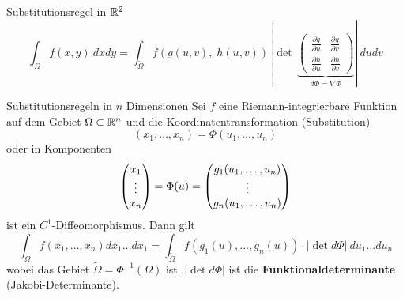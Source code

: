 \begin{Satz}{Substitutionsregel in $\mathbb{R}^2$}{}
    \[
        \int_{\Omega} f(x,y) ~ dx dy = \int_{\widetilde{\Omega}} f(g(u, v), \; h(u, v)) \, 
		    \left\lvert\det \, \underbrace{\begin{pmatrix}
			    \frac{\partial g}{\partial u} & \frac{\partial g}{\partial v}\\
			    \frac{\partial h}{\partial u} & \frac{\partial h}{\partial v}
		    \end{pmatrix}}_{d\Phi = \nabla\Phi} \right\rvert
	    ~ du dv
    \]
\end{Satz}

\begin{Satz}{Substitutionsregeln in $n$ Dimensionen}{}
    Sei $f$ eine Riemann-integrierbare Funktion auf dem Gebiet $\Omega \subset \mathbb{R}^n$ und die Koordinatentransformation (Substitution)
    \[
    (x_1,\hdots,x_n) = \Phi(u_1, \hdots,  u_n)
    \]
    oder in Komponenten
    \[
        \begin{pmatrix} x_1 \\ \vdots \\ x_n \end{pmatrix}
        = \Phi(u)
        = \begin{pmatrix} g_1(u_1,\hdots,u_n) \\ \vdots \\ g_n(u_1,\hdots,u_n) \end{pmatrix}
    \]
    ist ein $C^1$-Diffeomorphismus. Dann gilt
    \[
        \int_\Omega f(x_1, \hdots, x_n)dx_1\hdots dx_1 = \int_{\widetilde{\Omega}} f(g_1(u), \hdots, g_n(u)) \cdot |\det d \Phi|\ du_1\hdots du_n
    \]
    wobei das Gebiet $\widetilde{\Omega} = \Phi^{-1}(\Omega)$ ist. $|\det d\Phi|$ ist die \textbf{Funktionaldeterminante} (Jakobi-Determinante).
\end{Satz}

